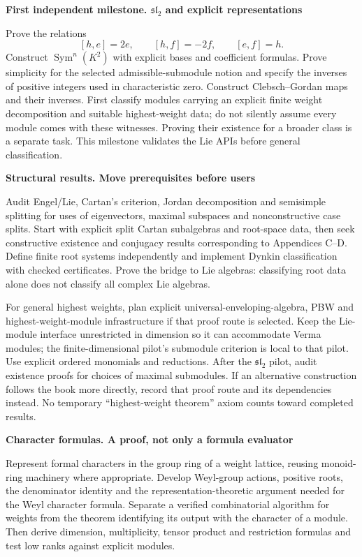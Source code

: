 \documentclass[11pt,a4paper]{article}
\newcommand{\slie}{\mathfrak{sl}}
\newcommand{\Sym}{\operatorname{Sym}}
\newcommand{\stage}[2]{\par\textbf{#1. #2}\par}
\begin{document}
\stage{First independent milestone}{$\slie_2$ and explicit representations}
Prove the relations
\[
 [h,e]=2e,\qquad [h,f]=-2f,\qquad [e,f]=h.
\]
Construct $\Sym^n(K^2)$ with explicit bases and coefficient formulas.
Prove simplicity for the selected admissible-submodule notion and specify
the inverses of positive integers used in characteristic zero. Construct
Clebsch--Gordan maps and their inverses. First classify modules carrying an
explicit finite weight decomposition and suitable highest-weight data;
do not silently assume every module comes with these witnesses.
Proving their existence for a broader class is a separate task. This
milestone validates the Lie APIs before general classification.

\stage{Structural results}{Move prerequisites before users}
Audit Engel/Lie, Cartan's criterion, Jordan decomposition and semisimple
splitting for uses of eigenvectors, maximal subspaces and nonconstructive
case splits. Start with explicit split Cartan subalgebras and root-space
data, then seek constructive existence and conjugacy results corresponding
to Appendices C--D. Define finite root systems independently and implement
Dynkin classification with checked certificates. Prove the bridge to Lie
algebras: classifying root data alone does not classify all complex Lie algebras.

For general highest weights, plan explicit universal-enveloping-algebra,
PBW and highest-weight-module infrastructure if that proof route is selected.
Keep the Lie-module interface unrestricted in dimension so it can accommodate
Verma modules; the finite-dimensional pilot's submodule criterion is local
to that pilot.
Use explicit ordered monomials and reductions. After the $\slie_2$ pilot,
audit existence proofs for choices of maximal submodules. If an alternative
construction follows the book more directly, record that proof route and its
dependencies instead. No temporary ``highest-weight theorem'' axiom counts
toward completed results.

\stage{Character formulas}{A proof, not only a formula evaluator}
Represent formal characters in the group ring of a weight lattice, reusing
monoid-ring machinery where appropriate. Develop Weyl-group actions,
positive roots, the denominator identity and the representation-theoretic
argument needed for the Weyl character formula. Separate a verified
combinatorial algorithm for weights from the theorem identifying its output
with the character of a module. Then derive dimension, multiplicity, tensor
product and restriction formulas and test low ranks against explicit modules.
\end{document}
